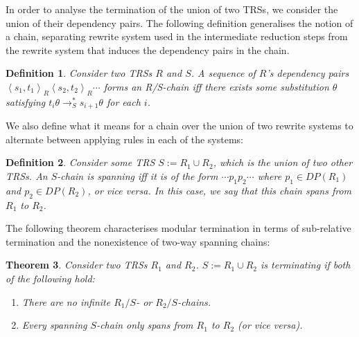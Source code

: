 \documentclass{article}
\newtheorem{theorem}{Theorem}[section]
\newtheorem{definition}[theorem]{Definition}
\newcommand{\dpair}[2]{\left\langle #1, #2 \right\rangle}
\begin{document}
In order to analyse the termination of the union of two TRSs, we consider the union of their dependency pairs. The following definition generalises the notion of a chain, separating rewrite system used in the intermediate reduction steps from the rewrite system that induces the dependency pairs in the chain.

\begin{definition}
    Consider two TRSs $R$ and $S$. A sequence of $R$'s dependency pairs $\dpair{s_1}{t_1}_R \dpair{s_2}{t_2}_R \cdots$ forms an \emph{R/S-chain} iff there exists some substitution $\theta$ satisfying $t_i \theta \rightarrow^*_S s_{i+1}\theta$ for each $i$. 
\end{definition}

We also define what it means for a chain over the union of two rewrite systems to alternate between applying rules in each of the systems:
\begin{definition}
    Consider some TRS $S := R_1 \cup R_2$, which is the union of two other TRSs. An $S$-chain is \emph{spanning} iff it is of the form $\cdots p_1 p_2 \cdots$ where $p_1 \in DP(R_1)$ and $p_2 \in DP(R_2)$, or vice versa. In this case, we say that this chain spans \emph{from} $R_1$ \emph{to} $R_2$.
\end{definition}
The following theorem characterises modular termination in terms of sub-relative termination and the nonexistence of two-way spanning chains:
\begin{theorem} \label{thm:mod_span_term}
    Consider two TRSs $R_1$ and $R_2$. $S := R_1 \cup R_2$ is terminating if both of the following hold: \begin{enumerate}
        \item There are no infinite $R_1/S$- or $R_2/S$-chains. \label{cond:no_r_chains}
        \item Every spanning $S$-chain only spans from $R_1$ to $R_2$ (or vice versa). \label{cond:no_span_chains}
    \end{enumerate}
\end{theorem}
\end{document}
